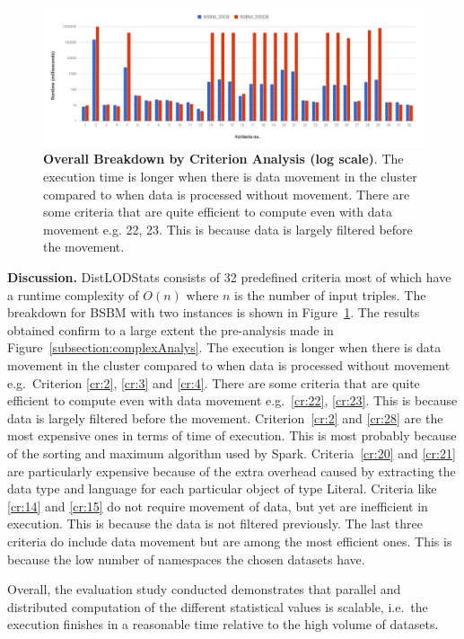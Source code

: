 \begin{figure}
\centering
\includegraphics[width=1\columnwidth]{images/4_distlodstats/distlodstats-overall-breakdown.pdf}
\caption{\textbf{Overall Breakdown by Criterion Analysis (log scale)}.
The execution time is longer when there is data movement in the cluster compared to when data is processed without movement.
There are some criteria that are quite efficient to compute even with data movement e.g. 22, 23. 
This is because data is largely filtered before the movement.
}
\label{fig:Breakdown}
\end{figure}

\textbf{Discussion.}
DistLODStats consists of 32 predefined criteria most of which have a runtime complexity of $O(n)$ where $n$ is the number of input triples. The breakdown for BSBM with two instances is shown in Figure~\ref{fig:Breakdown}.
The results obtained confirm to a large extent the pre-analysis made in Figure~\ref{subsection:complexAnalys}.
The execution is longer when there is data movement in the cluster compared to when data is processed without movement e.g.~Criterion \ref{cr:2}, \ref{cr:3} and \ref{cr:4}.
There are some criteria that are quite efficient to compute even with data movement e.g.~\ref{cr:22}, \ref{cr:23}. This is because data is largely filtered before the movement. 
Criterion~\ref{cr:2} and \ref{cr:28} are the most expensive ones in terms of time of execution.
This is most probably because of the sorting and maximum algorithm used by Spark.
Criteria~\ref{cr:20} and \ref{cr:21} are particularly expensive because of the extra overhead caused by extracting the data type and language for each particular object of type Literal.
Criteria like \ref{cr:14} and \ref{cr:15} do not require movement of data, but yet are inefficient in execution. This is because the data is not filtered previously.
The last three criteria do include data movement but are among the most efficient ones.
This is because the low number of namespaces the chosen datasets have.

Overall, the evaluation study conducted demonstrates that parallel and distributed computation of the different statistical values is scalable, i.e.~the execution finishes in a reasonable time relative to the high volume of datasets.


